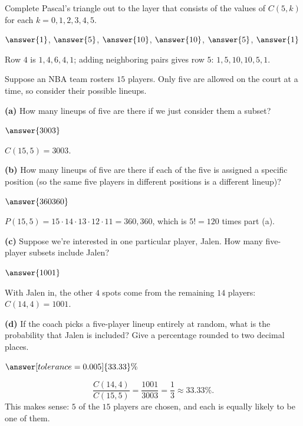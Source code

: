 \documentclass[12pt]{ximera}
\begin{document}
\begin{problem}
Complete Pascal's triangle out to the layer that consists of the values of $C(5,k)$ for
each $k=0,1,2,3,4,5$.

$\answer{1}$, $\answer{5}$, $\answer{10}$, $\answer{10}$, $\answer{5}$, $\answer{1}$

\begin{feedback}
Row $4$ is $1,4,6,4,1$; adding neighboring pairs gives row $5$: $1,5,10,10,5,1$.
\end{feedback}
\end{problem}

\begin{problem}
Suppose an NBA team rosters $15$ players. Only five are allowed on the court at a time,
so consider their possible lineups.

\begin{prompt}
\textbf{(a)} How many lineups of five are there if we just consider them a subset?

$\answer{3003}$

\begin{feedback}
$C(15,5)=3003$.
\end{feedback}
\end{prompt}

\begin{prompt}
\textbf{(b)} How many lineups of five are there if each of the five is assigned a
specific position (so the same five players in different positions is a different
lineup)?

$\answer{360360}$

\begin{feedback}
$P(15,5)=15\cdot 14\cdot 13\cdot 12\cdot 11=360{,}360$, which is $5!=120$ times part (a).
\end{feedback}
\end{prompt}

\begin{prompt}
\textbf{(c)} Suppose we're interested in one particular player, Jalen. How many
five-player subsets include Jalen?

$\answer{1001}$

\begin{feedback}
With Jalen in, the other $4$ spots come from the remaining $14$ players:
$C(14,4)=1001$.
\end{feedback}
\end{prompt}

\begin{prompt}
\textbf{(d)} If the coach picks a five-player lineup entirely at random, what is the
probability that Jalen is included? Give a percentage rounded to two decimal places.

$\answer[tolerance=0.005]{33.33}\%$

\begin{feedback}
\[ \frac{C(14,4)}{C(15,5)}=\frac{1001}{3003}=\frac13\approx 33.33\%. \]
This makes sense: $5$ of the $15$ players are chosen, and each is equally likely to be
one of them.
\end{feedback}
\end{prompt}
\end{problem}
\end{document}
